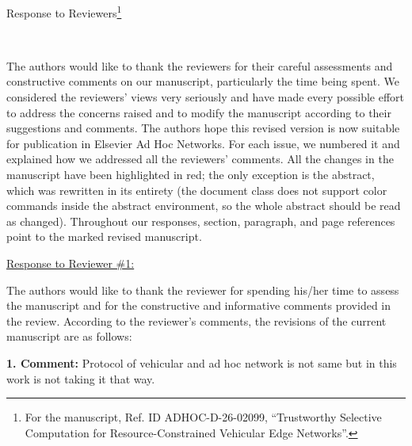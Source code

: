 \documentclass[1p,12pt,authoryear]{elsarticle}
\begin{document}
\newpage

\makeatletter
\def\@xfootnote[#1]{%
  \protected@xdef\@thefnmark{#1}%
  \@footnotemark\@footnotetext}
\makeatother

\begin{center}
\huge Response to Reviewers\footnote[*]{For the manuscript, Ref. ID ADHOC-D-26-02099, ``Trustworthy Selective Computation for Resource-Constrained Vehicular Edge Networks''.}
\end{center}

~

\noindent The authors would like to thank the reviewers for their careful assessments and constructive comments on our manuscript, particularly the time being spent. We considered the reviewers' views very seriously and have made every possible effort to address the concerns raised and to modify the manuscript according to their suggestions and comments. The authors hope this revised version is now suitable for publication in Elsevier Ad Hoc Networks. For each issue, we numbered it and explained how we addressed all the reviewers' comments. All the changes in the manuscript have been highlighted in red; the only exception is the abstract, which was rewritten in its entirety (the document class does not support color commands inside the abstract environment, so the whole abstract should be read as changed). Throughout our responses, section, paragraph, and page references point to the marked revised manuscript.

\newpage


\begin{large}
\noindent \underline{Response to Reviewer \#1:}
\end{large}

\vspace{10pt}

\noindent The authors would like to thank the reviewer for spending his/her time to assess the manuscript and for the constructive and informative comments provided in the review. According to the reviewer's comments, the revisions of the current manuscript are as follows:

\vspace{0.5cm}
\noindent \textbf{1. Comment:} Protocol of vehicular and ad hoc network is not same but in this work is not taking it that way.
\end{document}
